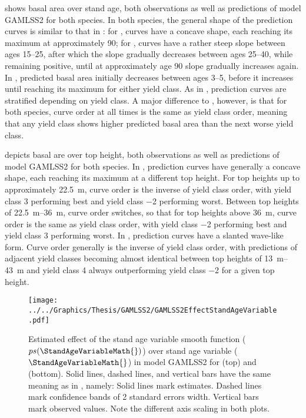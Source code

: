  shows basal area over stand age, both observations as well as predictions of model GAMLSS2 for both species.  In both species, the general shape of the prediction curves is similar to that in :  for \Beech{}, curves have a concave shape, each reaching its maximum at approximately \SI{90}{\year};  for \Spruce{}, curves have a rather steep slope between ages \SIrange{15}{25}{\year}, after which the slope gradually decreases between ages \SIrange{25}{40}{\year}, while remaining positive, until at approximately age \SI{90}{\year} slope gradually increases again.  In \Beech{}, predicted basal area initially decreases between ages \SIrange{3}{5}{\year}, before it increases until reaching its maximum for either yield class.  As in , prediction curves are stratified depending on yield class.  A major difference to , however, is that for both species, curve order at all times is the same as yield class order, meaning that any yield class shows higher predicted basal area than the next worse yield class.

 depicts basal are over top height, both observations as well as predictions of model GAMLSS2 for both species.  In \Beech{}, prediction curves have generally a concave shape, each reaching its maximum at a different top height.  For top heights up to approximately \SI{22.5}{\meter}, curve order is the inverse of yield class order, with yield class \num{3} performing best and yield class \num{-2} performing worst.  Between top heights of \SIrange{22.5}{36}{\meter}, curve order switches, so that for top heights above \SI{36}{\meter}, curve order is the same as yield class order, with yield class \num{-2} performing best and yield class \num{3} performing worst.  In \Spruce{}, prediction curves have a slanted wave-like form.  Curve order generally is the inverse of yield class order, with predictions of adjacent yield classes becoming almost identical between top heights of \SIrange{13}{43}{\meter} and yield class \num{4} always outperforming yield class \num{-2} for a given top height.

\begin{figure}[h]
  \centering
  \texttt{[image: ../../Graphics/Thesis/GAMLSS2/GAMLSS2EffectStandAgeVariable.pdf]}
  \caption{Estimated effect of the stand age variable smooth function (\(ps(\StandAgeVariableMath{})\)) over stand age variable (\(\StandAgeVariableMath{}\)) in model GAMLSS2 for \Beech{} (top) and \Spruce{} (bottom).  Solid lines, dashed lines, and vertical bars have the same meaning as in , namely:  Solid lines mark estimates.  Dashed lines mark confidence bands of 2 standard errors width.  Vertical bars mark observed values.  Note the different axis scaling in both plots.}
  \label{fig:GAMLSS2EffectStandAgeVariable}
\end{figure}


